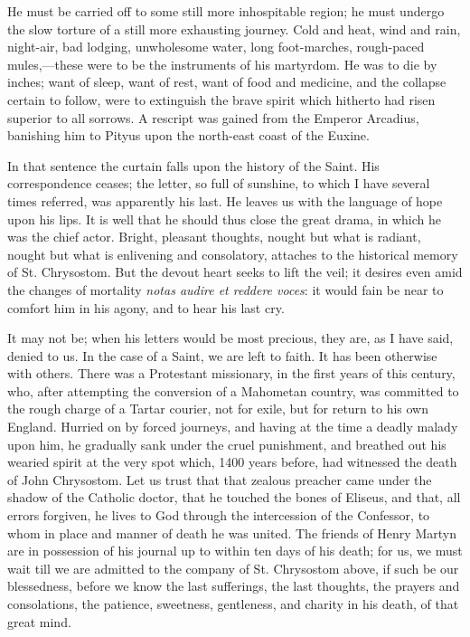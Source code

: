 He must be carried off to some still more inhospitable region; he
must undergo the slow torture of a still more exhausting journey. Cold
and heat, wind and rain, night-air, bad lodging, unwholesome water,
long foot-marches, rough-paced mules,—these were to be the
instruments of his martyrdom. He was to die by inches; want of sleep,
want of rest, want of food and medicine, and the collapse certain to
follow, were to extinguish the brave spirit which hitherto had risen
superior to all sorrows. A rescript was gained from the Emperor
Arcadius, banishing him to Pityus upon the north-east coast of the
Euxine.

In that sentence the curtain falls upon the history of the Saint.
His correspondence ceases; the letter, so full of sunshine, to which I
have several times referred, was apparently his last. He leaves us
with the language of hope upon his lips. It is well that he should
thus close the great drama, in which he was the chief actor. Bright,
pleasant thoughts, nought but what is radiant, nought but what is
enlivening and consolatory, attaches to the historical memory of St.
Chrysostom. But the devout heart seeks to lift the veil; it desires
even amid the changes of mortality \emph{notas audire et reddere voces}:
it would fain be near to comfort him in his agony, and to hear his
last cry.

It may not be; when his letters would be most precious, they are,
as I have said, denied to us. In the case of a Saint, we are left to
faith. It has been otherwise with others. There was a Protestant
missionary, in the first years of this century, who, after attempting
the conversion of a Mahometan country, was committed to the rough
charge of a Tartar courier, not for exile, but for return to his own
England. Hurried on by forced journeys, and having at the time a
deadly malady upon him, he gradually sank under the cruel punishment,
and breathed out his wearied spirit at the very spot which, 1400 years
before, had witnessed the death of John Chrysostom. Let us trust that
that zealous preacher came under the shadow of the Catholic doctor,
that he touched the bones of Eliseus, and that, all errors forgiven,
he lives to God through the intercession of the Confessor, to whom in
place and manner of death he was united. The friends of Henry Martyn
are in possession of his journal up to within ten days of his
death; for us, we must wait till we are admitted to the company of St.
Chrysostom above, if such be our blessedness, before we know the last
sufferings, the last thoughts, the prayers and consolations, the
patience, sweetness, gentleness, and charity in his death, of that
great mind.

